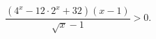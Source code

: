 \begin{ex}[type=inequality]
	\begin{condition}
		$\dfrac{(4^x - 12\cdot2^x + 32)(x - 1)}{\sqrt{x} - 1}> 0.$
	\end{condition}
	\answer{$ x \in[0;1)\cup(1;2)\cup(3;+\infty).$}
\end{ex}